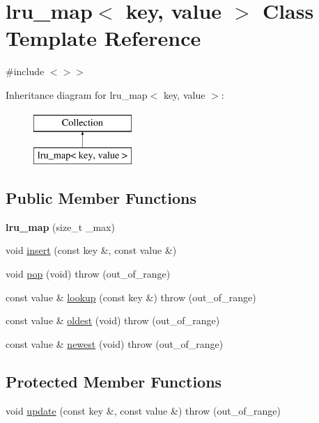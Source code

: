 \hypertarget{classlru__map}{\section{lru\-\_\-map$<$ key, value $>$ \-Class \-Template \-Reference}
\label{classlru__map}
}


{\ttfamily \#include $<$$>$$>$}

\-Inheritance diagram for lru\-\_\-map$<$ key, value $>$\-:\begin{figure}[H]
\begin{center}
\leavevmode
\includegraphics[height=2.000000cm]{classlru__map}
\end{center}
\end{figure}
\subsection*{\-Public \-Member \-Functions}
\begin{DoxyCompactItemize}
\item 
\hypertarget{classlru__map_a752d0808abe6c1292648629015981276}{{\bfseries lru\-\_\-map} (size\-\_\-t \-\_\-max)}\label{classlru__map_a752d0808abe6c1292648629015981276}

\item 
void \hyperlink{classlru__map_a5142903b31bdb74dd5fbc3854a894297}{insert} (const key \&, const value \&)
\item 
void \hyperlink{classlru__map_a8f085493a7a6b9b340692fbba7ec9ca6}{pop} (void)  throw (out\-\_\-of\-\_\-range)
\item 
const value \& \hyperlink{classlru__map_a1cf0f8002a81881bef20067e69151244}{lookup} (const key \&)  throw (out\-\_\-of\-\_\-range)
\item 
const value \& \hyperlink{classlru__map_ac10bc855e29c79d510649e0f9fa06f39}{oldest} (void)  throw (out\-\_\-of\-\_\-range)
\item 
const value \& \hyperlink{classlru__map_a6185946a684b571a47ea759cc7d02d25}{newest} (void)  throw (out\-\_\-of\-\_\-range)
\end{DoxyCompactItemize}
\subsection*{\-Protected \-Member \-Functions}
\begin{DoxyCompactItemize}
\item 
void \hyperlink{classlru__map_a8e21c538f1ae781a23a436d30401556b}{update} (const key \&, const value \&)  throw (out\-\_\-of\-\_\-range)
\end{DoxyCompactItemize}
